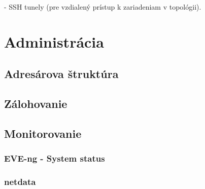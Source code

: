 - SSH tunely (pre vzdialený prístup k zariadeniam v topológii).

\section{Administrácia}

\subsection{Adresárova štruktúra}

\subsection{Zálohovanie}

\subsection{Monitorovanie}

\subsubsection{EVE-ng - System status}

\subsubsection{netdata}